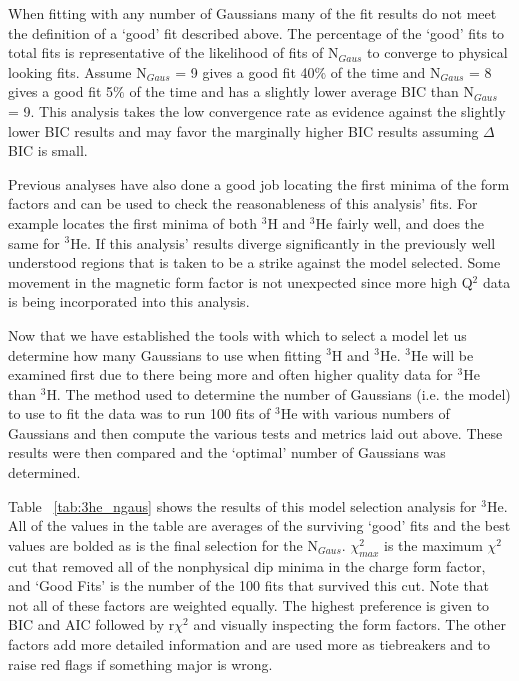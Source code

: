 When fitting with any number of Gaussians many of the fit results do not meet the definition of a `good' fit described above. The percentage of the `good' fits to total fits is representative of the likelihood of fits of N$_{Gaus}$ to converge to physical looking fits. Assume N$_{Gaus}$ = 9 gives a good fit 40$\%$ of the time and N$_{Gaus}$ = 8 gives a good fit 5$\%$ of the time and has a slightly lower average BIC than N$_{Gaus}$ = 9. This analysis takes the low convergence rate as evidence against the slightly lower BIC results and may favor the marginally higher BIC results assuming $\Delta$BIC is small. 

Previous analyses have also done a good job locating the first minima of the form factors and can be used to check the reasonableness of this analysis' fits. For example \cite{Article:Amroun} locates the first minima of both $^3$H and $^3$He fairly well, and \cite{Article:Alex} does the same for $^3$He. If this analysis' results diverge significantly in the previously well understood regions that is taken to be a strike against the model selected. Some movement in the magnetic form factor is not unexpected since more high Q$^2$ data is being incorporated into this analysis.

Now that we have established the tools with which to select a model let us determine how many Gaussians to use when fitting $^3$H and $^3$He. $^3$He will be examined first due to there being more and often higher quality data for $^3$He than $^3$H. The method used to determine the number of Gaussians (i.e. the model) to use to fit the data was to run 100 fits of $^3$He with various numbers of Gaussians and then compute the various tests and metrics laid out above. These results were then compared and the `optimal' number of Gaussians was determined.

Table ~\ref{tab:3he_ngaus} shows the results of this model selection analysis for $^3$He. All of the values in the table are averages of the surviving `good' fits and the best values are bolded as is the final selection for the N$_{Gaus}$. $\chi^2_{max}$ is the maximum $\chi^2$ cut that removed all of the nonphysical dip minima in the charge form factor, and `Good Fits' is the number of the 100 fits that survived this cut. Note that not all of these factors are weighted equally. The highest preference is given to BIC and AIC followed by r$\chi^2$ and visually inspecting the form factors. The other factors add more detailed information and are used more as tiebreakers and to raise red flags if something major is wrong.

